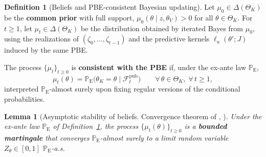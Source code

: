 \documentclass[12pt]{article}
\numberwithin{equation}{section}
\numberwithin{table}{section}
\newtheorem{lemma}[theorem]{Lemma}
\theoremstyle{definition}
\newtheorem{definition}[theorem]{Definition}
\newcommand{\ProbE}{\mathbb{P}_{\mathrm{E}}}
\begin{document}
\begin{definition}[Beliefs and PBE-consistent Bayesian updating]
\label{def:beliefs-martingale}
Let $\mu_0\in\Delta(\Theta_K)$ be the \textbf{common prior} with full support,
$\mu_0(\theta\mid z,\theta_V)>0$ for all $\theta\in\Theta_K$.
For $t\ge 1$, let $\mu_t\in\Delta(\Theta_K)$ be the distribution obtained by
iterated Bayes from $\mu_0$, using the realizations of
$(\zeta_0,\ldots,\zeta_{t-1})$ and the predictive kernels
$\ell_u(\theta';J)$ induced by the same PBE.

The process $\{\mu_t\}_{t\ge 0}$ is \textbf{consistent with the PBE} if, under
the ex-ante law $\ProbE$,
\begin{equation}
\label{eq:beliefs-ebp-consistency}
\mu_t(\theta)
=\ProbE\bigl(\theta_K=\theta\mid\mathcal{F}_t^{\mathrm{pub}}\bigr)
\qquad\forall\,\theta\in\Theta_K,\;\forall\,t\ge 1,
\end{equation}
interpreted $\ProbE$-almost surely upon fixing regular versions of the
conditional probabilities.
\end{definition}

\bigskip

\begin{lemma}[Asymptotic stability of beliefs. Convergence theorem of
\citeauthor{Doob1953Stochastic}, \citeyear{Doob1953Stochastic}]
\label{lem:asymptotic-beliefs}
Under the ex-ante law $\ProbE$ of
Definition~\ref{def:beliefs-martingale}, the process
$\{\mu_t(\theta)\}_{t\ge 0}$ is a \textbf{bounded martingale} that converges
$\ProbE$-almost surely to a limit random variable
$Z_\theta\in[0,1]$ $\ProbE$-a.s.
\end{lemma}
\end{document}
